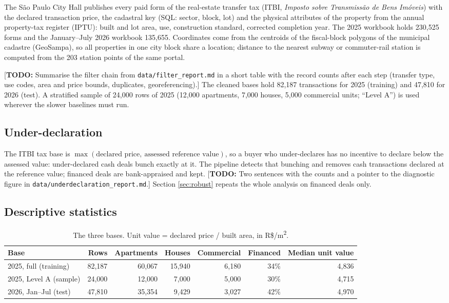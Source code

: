 \documentclass[11pt,a4paper]{article}
\newcommand{\todo}[1]{\textcolor{red!70!black}{[\textbf{TODO:} #1]}}
\newcommand{\Rsqm}{R\$/m\textsuperscript{2}}
\begin{document}
The São Paulo City Hall publishes every paid form of the real-estate transfer tax (ITBI,
\emph{Imposto sobre Transmissão de Bens Imóveis}) with the declared transaction price, the
cadastral key (SQL: sector, block, lot) and the physical attributes of the property from the annual
property-tax register (IPTU): built and lot area, use, construction standard, corrected completion
year. The 2025 workbook holds 230{,}525 forms and the January--July 2026 workbook 135{,}655.
Coordinates come from the centroids of the fiscal-block polygons of the municipal cadastre
(GeoSampa), so all properties in one city block share a location; distance to the nearest subway
or commuter-rail station is computed from the 203 station points of the same portal.

\todo{Summarise the filter chain from \texttt{data/filter\_report.md} in a short table with the
record counts after each step (transfer type, use codes, area and price bounds, duplicates,
georeferencing).} The cleaned bases hold 82{,}187 transactions for 2025 (training) and 47{,}810 for
2026 (test). A stratified sample of 24{,}000 rows of 2025 (12{,}000 apartments, 7{,}000 houses,
5{,}000 commercial units; ``Level A'') is used wherever the slower baselines must run.

\subsection{Under-declaration}

The ITBI tax base is $\max(\text{declared price},\ \text{assessed reference value})$, so a buyer who
under-declares has no incentive to declare below the assessed value: under-declared cash deals bunch
exactly at it. The pipeline detects that bunching and removes cash transactions declared at the
reference value; financed deals are bank-appraised and kept. \todo{Two sentences with the counts and
a pointer to the diagnostic figure in \texttt{data/underdeclaration\_report.md}.} Section
\ref{sec:robust} repeats the whole analysis on financed deals only.

\subsection{Descriptive statistics}

\begin{table}[h]
\centering\small
\caption{The three bases. Unit value = declared price / built area, in \Rsqm.}
\label{tab:data}
\footnotesize
\begin{tabular}{lrrrrrr}
\toprule
Base & Rows & Apartments & Houses & Commercial & Financed & Median unit value \\
\midrule
2025, full (training) & 82{,}187 & 60{,}067 & 15{,}940 & 6{,}180 & 34\% & 4{,}836 \\
2025, Level A (sample) & 24{,}000 & 12{,}000 & 7{,}000 & 5{,}000 & 30\% & 4{,}715 \\
2026, Jan--Jul (test) & 47{,}810 & 35{,}354 & 9{,}429 & 3{,}027 & 42\% & 4{,}970 \\
\bottomrule
\end{tabular}
\end{table}
\end{document}
